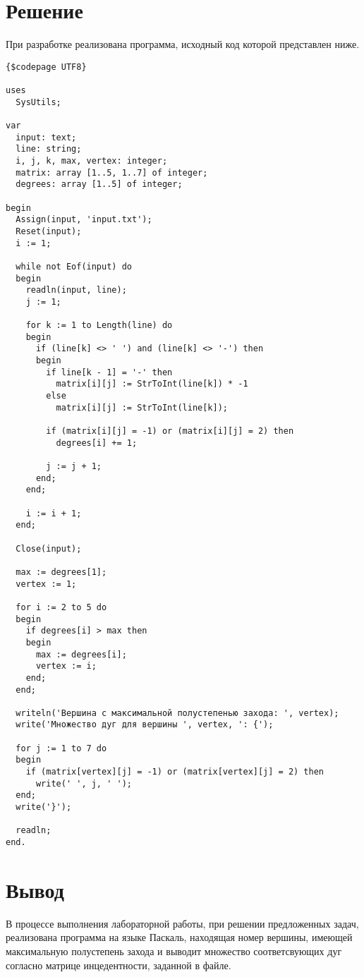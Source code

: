\documentclass[a4paper,14pt]{extarticle}
\begin{document}
  \section*{Решение}

  При разработке реализована программа, исходный код которой представлен ниже.
  \begin{Verbatim}[tabsize=2]
{$codepage UTF8}

uses
  SysUtils;

var
  input: text;
  line: string;
  i, j, k, max, vertex: integer;
  matrix: array [1..5, 1..7] of integer;
  degrees: array [1..5] of integer;

begin
  Assign(input, 'input.txt');
  Reset(input);
  i := 1;

  while not Eof(input) do
  begin
    readln(input, line);
    j := 1;

    for k := 1 to Length(line) do
    begin
      if (line[k] <> ' ') and (line[k] <> '-') then
      begin
        if line[k - 1] = '-' then
          matrix[i][j] := StrToInt(line[k]) * -1
        else
          matrix[i][j] := StrToInt(line[k]);

        if (matrix[i][j] = -1) or (matrix[i][j] = 2) then
          degrees[i] += 1;

        j := j + 1;
      end;
    end;

    i := i + 1;
  end;

  Close(input);

  max := degrees[1];
  vertex := 1;

  for i := 2 to 5 do
  begin
    if degrees[i] > max then
    begin
      max := degrees[i];
      vertex := i;
    end;
  end;

  writeln('Вершина с максимальной полустепенью захода: ', vertex);
  write('Множество дуг для вершины ', vertex, ': {');

  for j := 1 to 7 do
  begin
    if (matrix[vertex][j] = -1) or (matrix[vertex][j] = 2) then
      write(' ', j, ' ');
  end;
  write('}');

  readln;
end.
  \end{Verbatim}

  \section*{Вывод}
  В процессе выполнения лабораторной работы, при решении предложенных задач, реализована программа на языке Паскаль, находящая номер вершины, имеющей максимальную полустепень захода и выводит множество соответсвующих дуг согласно матрице инцедентности, заданной в файле.
\end{document}
